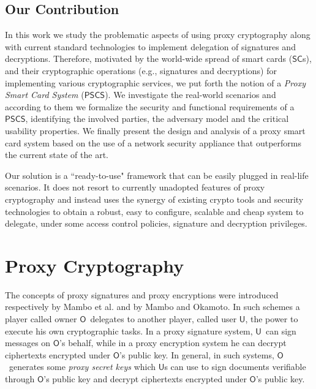 \documentclass{sig-alternate}
\newcommand{\Owner}{\ensuremath{\mathsf{O}}}
\newcommand{\User}{\ensuremath{\mathsf{U}}}
\newcommand{\SC}{\ensuremath{\mathsf{SC}}}
\newcommand{\PSCS}{\ensuremath{\mathsf{PSCS}}}
\begin{document}
\subsection{Our Contribution}
In this work we study the problematic aspects of using proxy cryptography along with current standard technologies to implement delegation of
signatures and decryptions. Therefore, motivated by the world-wide spread of smart cards (\SC s), and their cryptographic operations (e.g., signatures and decryptions) for implementing various cryptographic services, we put forth the notion of a \emph{Proxy Smart Card System }(\PSCS ).
We investigate the real-world scenarios and according to them we formalize the security and functional requirements of a \PSCS,
identifying the involved parties, the adversary model and the critical usability properties. We finally present the design and analysis of a proxy smart card system based on the use of a network security appliance that outperforms the current state of the art.

Our solution is a ``ready-to-use" framework that can be easily plugged
in real-life scenarios. It does not resort to currently
unadopted features of proxy cryptography and instead uses the synergy of
existing crypto tools and security technologies to obtain a robust, easy
to configure, scalable and cheap system to delegate, under some access
control policies, signature and decryption privileges.


\section{Proxy Cryptography}

The concepts of proxy signatures and proxy encryptions were introduced respectively by Mambo et al.\cite{DBLP:conf/ccs/MamboUO96} and by Mambo and Okamoto\cite{MamboO97}.  In such schemes a player called owner \Owner\, delegates to another player, called user \User, the power to execute his own cryptographic tasks. In a proxy signature system, \User\ can sign messages on \Owner's behalf, while in a proxy encryption system he can decrypt ciphertexts encrypted under \Owner's public key. In general, in such systems, \Owner\ generates some \emph{proxy secret keys} which \User s can use to sign documents verifiable through \Owner's public key and decrypt ciphertexts encrypted under \Owner's  public key.
\end{document}
